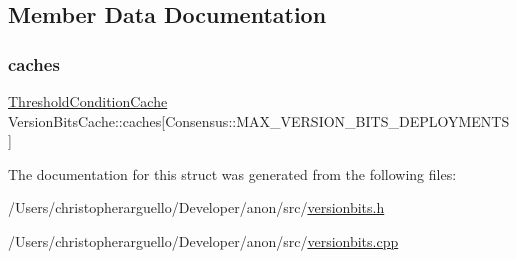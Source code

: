 \subsection{Member Data Documentation}
\mbox{\label{struct_version_bits_cache_ad532fe8c1050df1b7396db8a80f7b472}} 
\subsubsection{\texorpdfstring{caches}{caches}}
{\footnotesize\ttfamily \mbox{\hyperlink{versionbits_8h_a06fae3f599b3fadc0ea127cd55c111ab}{Threshold\+Condition\+Cache}} Version\+Bits\+Cache\+::caches\mbox{[}Consensus\+::\+M\+A\+X\+\_\+\+V\+E\+R\+S\+I\+O\+N\+\_\+\+B\+I\+T\+S\+\_\+\+D\+E\+P\+L\+O\+Y\+M\+E\+N\+TS\mbox{]}}



The documentation for this struct was generated from the following files\+:\begin{DoxyCompactItemize}
\item 
/\+Users/christopherarguello/\+Developer/anon/src/\mbox{\hyperlink{versionbits_8h}{versionbits.\+h}}\item 
/\+Users/christopherarguello/\+Developer/anon/src/\mbox{\hyperlink{versionbits_8cpp}{versionbits.\+cpp}}\end{DoxyCompactItemize}
